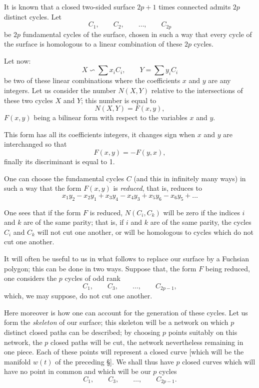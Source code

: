 \documentclass{article}
\begin{document}
It is known that a closed two-sided surface $2p + 1$ times connected admits $2p$ distinct cycles. Let
\[ C_{1}, \qquad C_{2}, \qquad \ldots, \qquad C_{2p} \]
be $2p$ fundamental cycles of the surface, chosen in such a way that every cycle of the surface is homologous to a linear combination of these $2p$ cycles.

Let now:
\[ X \backsim \sum x_{i} C_{i}, \qquad Y = \sum y_{i} C_{i} \]
be two of these linear combinations where the coefficients $x$ and $y$ are any integers. Let us consider the number $N(X, Y)$ relative to the intersections of these two cycles $X$ and $Y$; this number is equal to
\[ N(X, Y) = F(x, y), \]
$F(x, y)$ being a bilinear form with respect to the variables $x$ and $y$.


This form has all its coefficients integers, it changes sign when $x$ and $y$ are interchanged so that
\[ F(x, y) = -F(y, x), \]
finally its discriminant is equal to 1.

One can choose the fundamental cycles $C$ (and this in infinitely many ways) in such a way that the form $F(x, y)$ is \emph{reduced}, that is, reduces to
\[ x_{1}y_{2} - x_{2}y_{1} + x_{3}y_{4} - x_{4}y_{3} + x_{5}y_{6} - x_{6}y_{5} + \ldots \]

One sees that if the form $F$ is reduced, $N(C_{i}, C_{k})$ will be zero if the indices $i$ and $k$ are of the same parity; that is, if $i$ and $k$ are of the same parity, the cycles $C_{i}$ and $C_{k}$ will not cut one another, or will be homologous to cycles which do not cut one another.

It will often be useful to us in what follows to replace our surface by a Fuchsian polygon; this can be done in two ways. Suppose that, the form $F$ being reduced, one considers the $p$ cycles of odd rank
\[ C_{1}, \qquad C_{3}, \qquad \ldots, \qquad C_{2p-1}, \]
which, we may suppose, do not cut one another.

Here moreover is how one can account for the generation of these cycles. Let us form the \emph{skeleton} of our surface; this skeleton will be a network on which $p$ distinct closed paths can be described; by choosing $p$ points suitably on this network, the $p$ closed paths will be cut, the network nevertheless remaining in one piece. Each of these points will represent a closed curve [which will be the manifold $w(t)$ of the preceding \S]. We shall thus have $p$ closed curves which will have no point in common and which will be our $p$ cycles
\[ C_{1}, \qquad C_{3}, \qquad \ldots, \qquad C_{2p-1}. \]
\end{document}
